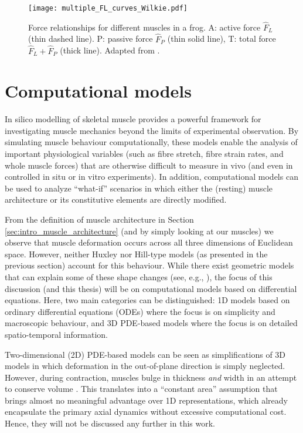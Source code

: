 \documentclass{sfuthesis}
\numberwithin{equation}{section}
\numberwithin{figure}{chapter}
\numberwithin{table}{chapter}
\theoremstyle{definition}
\begin{document}
\begin{figure}
    \centering
    \texttt{[image: multiple\_FL\_curves\_Wilkie.pdf]}
    \caption{Force relationships for different muscles in a frog. A: active force $\widehat{F}_L$ (thin dashed line). P: passive force $\widehat{F}_P$ (thin solid line), T: total force $\widehat{F}_L + \widehat{F}_P$ (thick line). Adapted from \cite{RassierMacintoshHerzog1999}.
    \label{fig:fl_curves_wilkie}}
\end{figure}


\section{Computational models}

In silico modelling of skeletal muscle provides a powerful framework for investigating muscle mechanics beyond the limits of experimental observation. By simulating muscle behaviour computationally, these models enable the analysis of important physiological variables (such as fibre stretch, fibre strain rates, and whole muscle forces) that are otherwise difficult to measure in vivo (and even in controlled in situ or in vitro experiments). In addition, computational models can be used to analyze ``what-if'' scenarios in which either the (resting) muscle architecture or its constitutive elements are directly modified.

From the definition of muscle architecture in Section \ref{sec:intro_muscle_architecture} (and by simply looking at our muscles) we observe that muscle deformation occurs across all three dimensions of Euclidean space. However, neither Huxley nor Hill-type models (as presented in the previous section) account for this behaviour. While there exist geometric models that can explain some of these shape changes (see, e.g., \cite{DickWakeling2018,Siebert20123D}), the focus of this discussion (and this thesis) will be on computational models based on differential equations. Here, two main categories can be distinguished: 1D models based on ordinary differential equations (ODEs) where the focus is on simplicity and macroscopic behaviour, and 3D PDE-based models where the focus is on detailed spatio-temporal information. 

Two-dimensional (2D) PDE-based models can be seen as simplifications of 3D models in which deformation in the out-of-plane direction is simply neglected. However, during contraction, muscles bulge in thickness \textit{and} width in an attempt to conserve volume \cite{BaskinPaolini}. This translates into a ``constant area'' assumption \cite{EpsteinHerzog2003} that brings almost no meaningful advantage over 1D representations, which already encapsulate the primary axial dynamics without excessive computational cost. Hence, they will not be discussed any further in this work.
\end{document}
